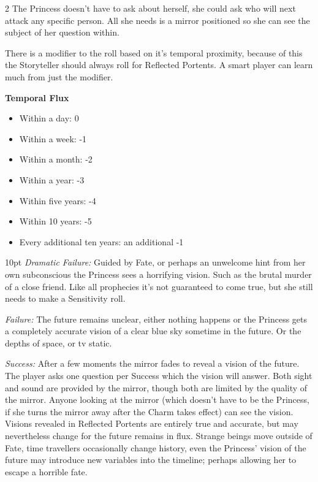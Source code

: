 \begin{multicols}{2}
The Princess doesn't have to ask about herself, she could ask who will next attack any specific person. All she needs is a mirror positioned so she can see the subject of her question within. 

There is a modifier to the roll based on it's temporal proximity, because of this the Storyteller should always roll for Reflected Portents. A smart player can learn much from just the modifier.

\begin{mybox} 

\textbf{Temporal Flux}

\begin{itemize}[label={}]

    \item Within a day: 0
    \item Within a week: -1
    \item Within a month: -2
    \item Within a year: -3
    \item Within five years: -4
    \item Within 10 years: -5
    \item Every additional ten years: an additional -1
	
	\end{itemize}
	\end{mybox}

   \begin{myindentpar}{10pt} \emph{Dramatic Failure:} Guided by Fate, or perhaps an unwelcome hint from her own subconscious the Princess sees a horrifying vision. Such as the brutal murder of a close friend. Like all prophecies it's not guaranteed to come true, but she still needs to make a Sensitivity roll.

    \emph{Failure:} The future remains unclear, either nothing happens or the Princess gets a completely accurate vision of a clear blue sky sometime in the future. Or the depths of space, or tv static.

    \emph{Success:} After a few moments the mirror fades to reveal a vision of the future. The player asks one question per Success which the vision will answer. Both sight and sound are provided by the mirror, though both are limited by the quality of the mirror. Anyone looking at the mirror (which doesn't have to be the Princess, if she turns the mirror away after the Charm takes effect) can see the vision. Visions revealed in Reflected Portents are entirely true and accurate, but may nevertheless change for the future remains in flux. Strange beings move outside of Fate, time travellers occasionally change history, even the Princess' vision of the future may introduce new variables into the timeline; perhaps allowing her to escape a horrible fate.


\end{myindentpar}
\end{multicols}

